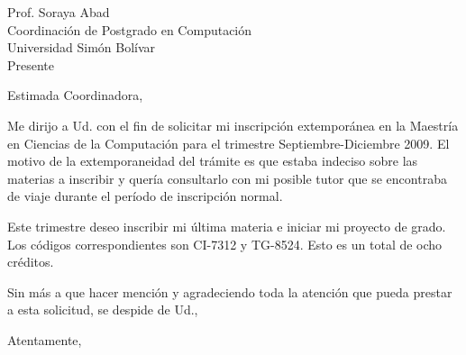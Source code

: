 \documentclass[]{letter}
\begin{document}
\pagestyle{empty}

\begin{letter}
\name{}
\date{Sartenejas, 21 de Septiembre de 2009}
\opening{Prof. Soraya Abad \\ Coordinación de Postgrado en Computación \\ Universidad Simón Bolívar \\ Presente}

Estimada Coordinadora,

Me dirijo a Ud. con el fin de solicitar mi inscripción extemporánea en la
Maestría en Ciencias de la Computación para el trimestre Septiembre-Diciembre
2009. El motivo de la extemporaneidad del trámite es que estaba indeciso sobre
las materias a inscribir y quería consultarlo con mi posible tutor que se
encontraba de viaje durante el período de inscripción normal.

Este trimestre deseo inscribir mi última materia e iniciar mi proyecto de grado.
Los códigos correspondientes son CI-7312 y TG-8524. Esto es un total de ocho
créditos.

Sin más a que hacer mención y agradeciendo toda la atención que pueda prestar
a esta solicitud, se despide de Ud.,

\closing{Atentamente,}

\end{letter}
\end{document}
